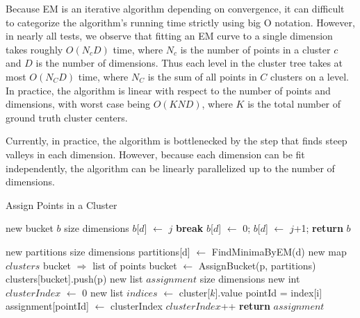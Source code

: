 \documentclass{acm_proc_article-sp}
\begin{document}
Because EM is an iterative algorithm depending on convergence, it can difficult to categorize the algorithm's running time strictly using big O notation. However, in nearly all tests, we observe that fitting an EM curve to a single dimension takes roughly $O(N_c D)$ time, where $N_c$ is the number of points in a cluster $c$ and $D$ is the number of dimensions. Thus each level in the cluster tree takes at most $O(N_C D)$ time, where $N_C$ is the sum of all points in $C$ clusters on a level. In practice, the algorithm is linear with respect to the number of points and dimensions, with worst case being $O(K N D)$, where $K$ is the total number of ground truth cluster centers. 

Currently, in practice, the algorithm is bottlenecked by the step that finds steep valleys in each dimension. However, because each dimension can be fit independently, the algorithm can be linearly parallelized up to the number of dimensions. 

\begin{algorithm}
\caption{Assign Points in a Cluster}\label{euclid}
\begin{algorithmic}[1]
\State new bucket $b$ \Comment size dimensions
\State $b$[$d$] $\leftarrow$ $j$
\State \textbf{break}
\EndIf
{}
\State $b$[$d$] $\leftarrow$ 0;
\Else
\State $b$[$d$] $\leftarrow$ $j$+1;
\EndIf
\EndFor
\EndFor
\State \textbf{return} $b$
\EndProcedure
\State

\State new partitions \Comment size dimensions
\State partitions[d] $\leftarrow$ FindMinimaByEM(d)
\EndFor
\State new map $clusters$ \Comment bucket $\Rightarrow$ list of points
\State bucket $\leftarrow$ AssignBucket(p, partitions)
\State clusters[bucket].push(p)
\EndFor
\State new list $assignment$ \Comment size dimensions
\State new int $clusterIndex$ $\leftarrow$ 0
\State new list $indices$ $\leftarrow$ cluster[$k$].value
\State pointId = index[i] 
\State assignment[pointId] $\leftarrow$  clusterIndex
\EndFor
\State $clusterIndex$++
\EndFor
\State \textbf{return} $assignment$
\EndProcedure
\end{algorithmic}
\end{algorithm}
\end{document}
